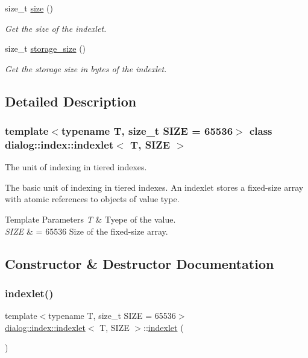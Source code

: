 \begin{DoxyCompactItemize}
size\+\_\+t \hyperlink{classdialog_1_1index_1_1indexlet_ade4239f0aba692226fb8dd9ff899df87}{size} ()
\begin{DoxyCompactList}\small\item\em Get the size of the indexlet. \end{DoxyCompactList}\item 
size\+\_\+t \hyperlink{classdialog_1_1index_1_1indexlet_a68a3f311fb6b2172c70619bc633e729b}{storage\+\_\+size} ()
\begin{DoxyCompactList}\small\item\em Get the storage size in bytes of the indexlet. \end{DoxyCompactList}\end{DoxyCompactItemize}


\subsection{Detailed Description}
\subsubsection*{template$<$typename T, size\+\_\+t S\+I\+ZE = 65536$>$\newline
class dialog\+::index\+::indexlet$<$ T, S\+I\+Z\+E $>$}

The unit of indexing in tiered indexes. 

The basic unit of indexing in tiered indexes. An indexlet stores a fixed-\/size array with atomic references to objects of value type.


\begin{DoxyTemplParams}{Template Parameters}
{\em T} & Tyepe of the value. \\
\hline
{\em S\+I\+ZE} & = 65536 Size of the fixed-\/size array. \\
\hline
\end{DoxyTemplParams}


\subsection{Constructor \& Destructor Documentation}
\mbox{\label{classdialog_1_1index_1_1indexlet_ab1bb4556decdfc358090e73a078e45d2}} 
\subsubsection{\texorpdfstring{indexlet()}{indexlet()}}
{\footnotesize\ttfamily template$<$typename T, size\+\_\+t S\+I\+ZE = 65536$>$ \\
\hyperlink{classdialog_1_1index_1_1indexlet}{dialog\+::index\+::indexlet}$<$ T, S\+I\+ZE $>$\+::\hyperlink{classdialog_1_1index_1_1indexlet}{indexlet} (\begin{DoxyParamCaption}{ }\end{DoxyParamCaption})\hspace{0.3cm}{\ttfamily [inline]}}



